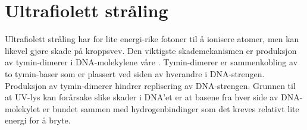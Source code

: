 \chapter{Ultrafiolett stråling}
Ultrafiolett stråling har for lite energi-rike fotoner til å ionisere atomer, men kan likevel gjøre skade på kroppsvev. Den viktigste skademekanismen er produksjon av tymin-dimerer i DNA-molekylene våre \cite{tve-uv}. Tymin-dimerer er sammenkobling av to tymin-baser som er plassert ved siden av hverandre i DNA-strengen. Produksjon av tymin-dimerer hindrer replisering av DNA-strengen. Grunnen til at UV-lys kan forårsake slike skader i DNA'et er at basene fra hver side av DNA-molekylet er bundet sammen med hydrogenbindinger som det kreves relativt lite energi for å bryte.